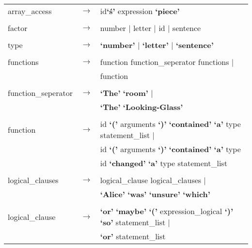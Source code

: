 \documentclass[landscape]{article}
\begin{document}
\begin{longtable}{ l c l}
    array\_access & \ensuremath{\to} &  id\textbf{`\'s'} expression  \textbf{`piece'}  \\

    \\

    factor & \ensuremath{\to} &  number  | letter  | id  | sentence   \\

    \\

    type & \ensuremath{\to} &  \textbf{`number'}  | \textbf{`letter'}  | \textbf{`sentence'}   \\

    \\

    functions & \ensuremath{\to} &  function  function\_seperator  functions   | \\
    & &  function \\

    \\

    function\_seperator & \ensuremath{\to} &  \textbf{`The'} \textbf{`room'}  | \\
    & & \textbf{`The'} \textbf{`Looking-Glass'} \\

    \\

    function & \ensuremath{\to} &  id \textbf{`('} arguments  \textbf{`)'} \textbf{`contained'} \textbf{`a'} type  statement\_list   | \\
    & &  id \textbf{`('} arguments  \textbf{`)'} \textbf{`contained'} \textbf{`a'} type \\
	& &  id \textbf{`changed'} \textbf{`a'} type  statement\_list  \\

    \\

    logical\_clauses & \ensuremath{\to} &  logical\_clause  logical\_clauses   | \\
    & &  \textbf{`Alice'} \textbf{`was'} \textbf{`unsure'} \textbf{`which'}  \\

    \\

    logical\_clause & \ensuremath{\to} &  \textbf{`or'} \textbf{`maybe'} \textbf{`('} expression\_logical  \textbf{`)'} \textbf{`so'} statement\_list   | \\
    & &  \textbf{`or'} statement\_list   \\


\end{longtable}
\end{document}
